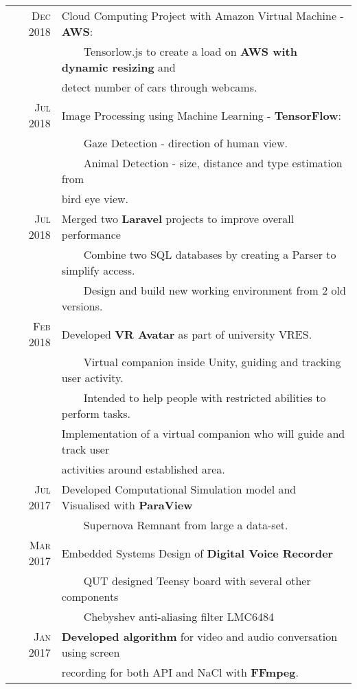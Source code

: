 \documentclass[a4paper,12pt]{article}
\newcommand{\tabitem}{~~\llap{\textbullet}~~}
\begin{document}
{\begin{tabular}{rl}
        \textsc{Dec} 2018 & Cloud Computing Project with Amazon Virtual Machine - \textbf{AWS}: \\
            & \tabitem Tensorlow.js to create a load on \textbf{AWS with dynamic resizing} and \\
            & detect number of cars through webcams. \\ [1pc]
            
        \textsc{Jul} 2018 & Image Processing using Machine Learning - \textbf{TensorFlow}: \\
            & \tabitem Gaze Detection - direction of human view. \\
            & \tabitem Animal Detection - size, distance and type estimation from \\
            & bird eye view.\\ [1pc]
            
		\textsc{Jul} 2018 & Merged two \textbf{Laravel} projects to improve overall performance \\
		    & \tabitem Combine two SQL databases by creating a Parser to simplify access. \\
		    & \tabitem Design and build new working environment from 2 old versions. \\ [1pc]
		    
		\textsc{Feb} 2018 & Developed \textbf{VR Avatar} as part of university VRES. \\ 
		    & \tabitem Virtual companion inside Unity, guiding and tracking user activity. \\
		    & \tabitem Intended to help people with restricted abilities to perform tasks. \\ & 
		    Implementation of a virtual companion who will guide and track user \\ & activities around established area.\\ [1pc]
		    
		\textsc{Jul} 2017 & Developed Computational Simulation model and Visualised with \textbf{ParaView} \\
		    & \tabitem Supernova Remnant from large a data-set. \\ [1pc]
		    
		\textsc{Mar} 2017 & Embedded Systems Design of \textbf{Digital Voice Recorder} \\
		    & \tabitem QUT designed Teensy board with several other components \\
		    & \tabitem Chebyshev anti-aliasing filter LMC6484 \\ [1pc]
		    
		\textsc{Jan} 2017 & \textbf{Developed algorithm} for video and audio conversation using screen \\ &recording for both API and NaCl with \textbf{FFmpeg}.
	\end{tabular}
}{}
\end{document}
